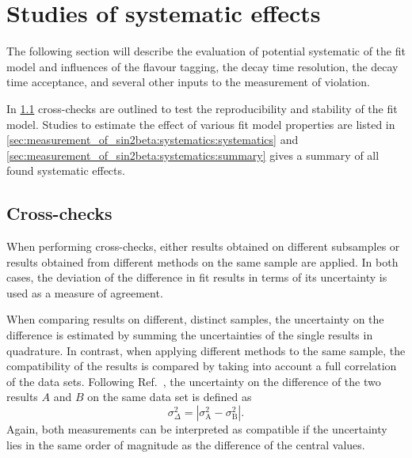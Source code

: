 
\section{Studies of systematic effects}
\label{sec:measurement_of_sin2beta:systematics}

The following section will describe the evaluation of potential systematic
 of the fit model and influences of the flavour tagging, the decay time
resolution, the decay time acceptance, and several other inputs to the
measurement of \CP violation.

In \cref{sec:measurement_of_sin2beta:systematics:cross_checks} cross-checks are
outlined to test the reproducibility and stability of the fit model. Studies to
estimate the effect of various fit model properties are listed in
\cref{sec:measurement_of_sin2beta:systematics:systematics} and
\cref{sec:measurement_of_sin2beta:systematics:summary} gives a summary of all
found systematic effects.

\subsection{Cross-checks}
\label{sec:measurement_of_sin2beta:systematics:cross_checks}

When performing cross-checks, either results obtained on different subsamples or
results obtained from different methods on the same sample are applied. In both
cases, the deviation of the difference in fit results in terms of its
uncertainty is used as a measure of agreement.

When comparing results on different, distinct samples, the uncertainty on the
difference is estimated by summing the uncertainties of the single results in
quadrature. In contrast, when applying different methods to the same sample, the
compatibility of the results is compared by taking into account a full
correlation of the data sets. Following Ref.~\cite{Barlow:2002yb}, the
uncertainty on the difference of the two results $A$ and $B$ on the same data
set is defined as
%
\begin{equation}
  \sigma^2_\Delta = \left\vert\sigma^2_{\text{A}} - \sigma^2_{\text{B}}\right\vert .
\end{equation}
%
Again, both measurements can be interpreted as compatible if the uncertainty
lies in the same order of magnitude as the difference of the central values.


